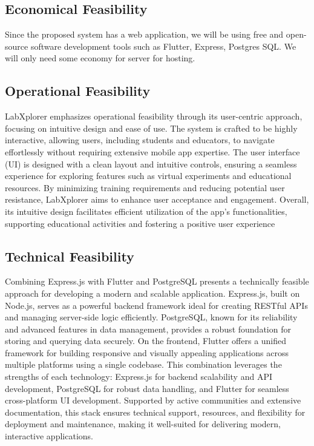 \subsection{Economical Feasibility}
Since the proposed system has a web application, we will be using free and open-source software development tools such as Flutter, Express, Postgres SQL. We will only need some economy for server for hosting.
\subsection{Operational Feasibility}
LabXplorer emphasizes operational feasibility through its user-centric approach, focusing on intuitive design and ease of use. The system is crafted to be highly interactive, allowing users, including students and educators, to navigate effortlessly without requiring extensive mobile app expertise. The user interface (UI) is designed with a clean layout and intuitive controls, ensuring a seamless experience for exploring features such as virtual experiments and educational resources. By minimizing training requirements and reducing potential user resistance, LabXplorer aims to enhance user acceptance and engagement. Overall, its intuitive design facilitates efficient utilization of the app's functionalities, supporting educational activities and fostering a positive user experience 
\subsection{Technical Feasibility}
Combining Express.js with Flutter and PostgreSQL presents a technically feasible approach for developing a modern and scalable application. Express.js, built on Node.js, serves as a powerful backend framework ideal for creating RESTful APIs and managing server-side logic efficiently. PostgreSQL, known for its reliability and advanced features in data management, provides a robust foundation for storing and querying data securely. On the frontend, Flutter offers a unified framework for building responsive and visually appealing applications across multiple platforms using a single codebase. This combination leverages the strengths of each technology: Express.js for backend scalability and API development, PostgreSQL for robust data handling, and Flutter for seamless cross-platform UI development. Supported by active communities and extensive documentation, this stack ensures technical support, resources, and flexibility for deployment and maintenance, making it well-suited for delivering modern, interactive applications.
